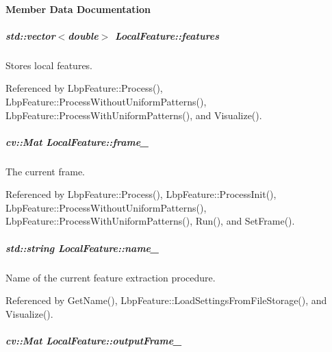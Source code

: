 \paragraph{Member Data Documentation}
\hypertarget{group___feature_extractor_a8197cec0d029bac380885167df9f65e5}{
\subparagraph[{features}]{\setlength{\rightskip}{0pt plus 5cm}std\-::vector$<$double$>$ Local\-Feature\-::features}}\label{group___feature_extractor_a8197cec0d029bac380885167df9f65e5}


Stores local features. 



Referenced by Lbp\-Feature\-::\-Process(), Lbp\-Feature\-::\-Process\-Without\-Uniform\-Patterns(), Lbp\-Feature\-::\-Process\-With\-Uniform\-Patterns(), and Visualize().

\hypertarget{group___feature_extractor_a585b0dc6e6184422c5563e80bff50ffa}{
\subparagraph[{frame\-\_\-}]{\setlength{\rightskip}{0pt plus 5cm}cv\-::\-Mat Local\-Feature\-::frame\-\_\-\hspace{0.3cm}{\ttfamily [protected]}}}\label{group___feature_extractor_a585b0dc6e6184422c5563e80bff50ffa}


The current frame. 



Referenced by Lbp\-Feature\-::\-Process(), Lbp\-Feature\-::\-Process\-Init(), Lbp\-Feature\-::\-Process\-Without\-Uniform\-Patterns(), Lbp\-Feature\-::\-Process\-With\-Uniform\-Patterns(), Run(), and Set\-Frame().

\hypertarget{group___feature_extractor_a0e73ef0aed82c04f06b6eeb9a9b9be8b}{
\subparagraph[{name\-\_\-}]{\setlength{\rightskip}{0pt plus 5cm}std\-::string Local\-Feature\-::name\-\_\-\hspace{0.3cm}{\ttfamily [protected]}}}\label{group___feature_extractor_a0e73ef0aed82c04f06b6eeb9a9b9be8b}


Name of the current feature extraction procedure. 



Referenced by Get\-Name(), Lbp\-Feature\-::\-Load\-Settings\-From\-File\-Storage(), and Visualize().

\hypertarget{group___feature_extractor_a1c7b8087feb05f02b09eb1b536d443e6}{
\subparagraph[{output\-Frame\-\_\-}]{\setlength{\rightskip}{0pt plus 5cm}cv\-::\-Mat Local\-Feature\-::output\-Frame\-\_\-\hspace{0.3cm}{\ttfamily [protected]}}}\label{group___feature_extractor_a1c7b8087feb05f02b09eb1b536d443e6}


